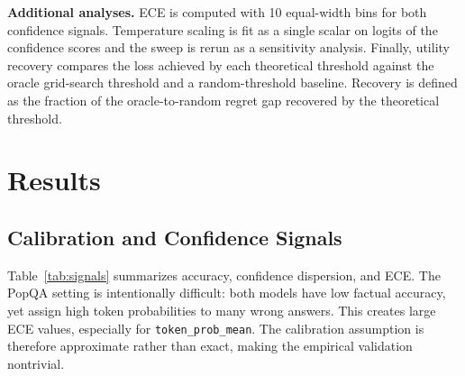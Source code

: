 \documentclass[letterpaper,10pt,twocolumn]{article}
\begin{document}
\textbf{Additional analyses.}
ECE is computed with 10 equal-width bins for both confidence signals.
Temperature scaling is fit as a single scalar on logits of the confidence
scores and the sweep is rerun as a sensitivity analysis. Finally, utility
recovery compares the loss achieved by each theoretical threshold against the
oracle grid-search threshold and a random-threshold baseline. Recovery is
defined as the fraction of the oracle-to-random regret gap recovered by the
theoretical threshold.

\section{Results}

\subsection{Calibration and Confidence Signals}

Table~\ref{tab:signals} summarizes accuracy, confidence dispersion, and ECE.
The PopQA setting is intentionally difficult: both models have low factual
accuracy, yet assign high token probabilities to many wrong answers. This
creates large ECE values, especially for \texttt{token\_prob\_mean}. The
calibration assumption is therefore approximate rather than exact, making the
empirical validation nontrivial.

\begin{table}[t]
\centering
\caption{Dataset accuracy and calibration. ECE uses 10 equal-width bins.}
\label{tab:signals}
\renewcommand{\arraystretch}{1.12}
\end{table}
\end{document}
